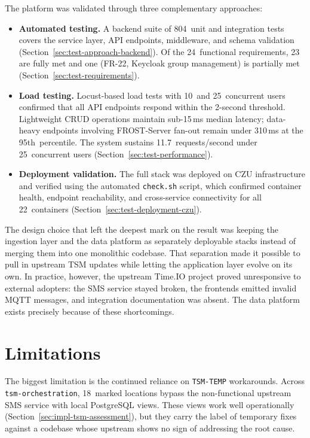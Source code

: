 \noindent
The platform was validated through three complementary approaches:

\begin{itemize}
  \item \textbf{Automated testing.} A backend suite of 804~unit and integration tests
        covers the service layer, API endpoints, middleware, and schema validation
        (Section~\ref{sec:test-approach-backend}). Of the 24~functional requirements,
        23 are fully met and one (FR-22, Keycloak group management) is partially met
        (Section~\ref{sec:test-requirements}).

  \item \textbf{Load testing.} Locust-based load tests with 10~and 25~concurrent users
        confirmed that all API endpoints respond within the 2-second threshold.
        Lightweight CRUD operations maintain sub-15\,ms median latency;
        data-heavy endpoints involving FROST-Server fan-out remain under 310\,ms at the
        95th~percentile. The system sustains 11.7~requests/second under 25~concurrent
        users (Section~\ref{sec:test-performance}).

  \item \textbf{Deployment validation.} The full stack was deployed on CZU
        infrastructure and verified using the automated \texttt{check.sh} script, which
        confirmed container health, endpoint reachability, and cross-service
        connectivity for all 22~containers
        (Section~\ref{sec:test-deployment-czu}).
\end{itemize}

The design choice that left the deepest mark on the result was keeping
the ingestion layer and the data platform as separately deployable stacks instead of
merging them into one monolithic codebase. That separation made it possible to pull in
upstream TSM updates while letting the application layer evolve on its own. In practice,
however, the upstream Time.IO project proved unresponsive to external adopters:
the SMS service stayed broken, the frontends emitted invalid MQTT messages, and integration
documentation was absent. The data platform exists precisely because of these shortcomings.

\section*{Limitations}

The biggest limitation is the continued reliance on \texttt{TSM-TEMP}
workarounds. Across \texttt{tsm-orchestration}, 18~marked locations bypass the non-functional
upstream SMS service with local PostgreSQL views. These views work well operationally
(Section~\ref{sec:impl-tsm-assessment}), but they carry the label of temporary fixes against a
codebase whose upstream shows no sign of addressing the root cause.

